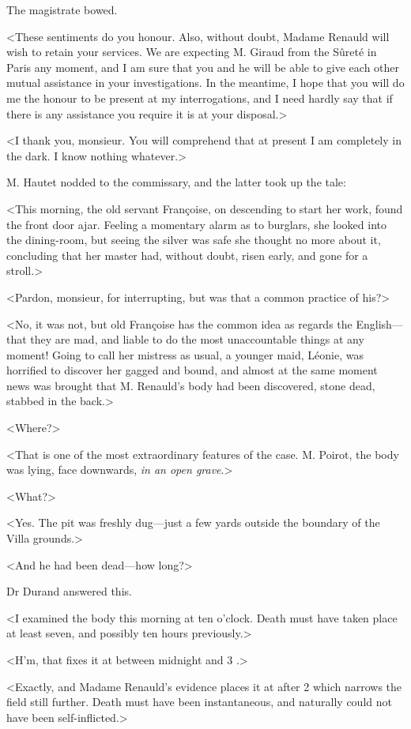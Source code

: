  The magistrate bowed. 

 <These sentiments do you honour. Also, without doubt, Madame Renauld will wish to retain your services. We are expecting M. Giraud from the Sûreté in Paris any moment, and I am sure that you and he will be able to give each other mutual assistance in your investigations. In the meantime, I hope that you will do me the honour to be present at my interrogations, and I need hardly say that if there is any assistance you require it is at your disposal.> 

 <I thank you, monsieur. You will comprehend that at present I am completely in the dark. I know nothing whatever.> 

 M. Hautet nodded to the commissary, and the latter took up the tale: 

 <This morning, the old servant Françoise, on descending to start her work, found the front door ajar. Feeling a momentary alarm as to burglars, she looked into the dining-room, but seeing the silver was safe she thought no more about it, concluding that her master had, without doubt, risen early, and gone for a stroll.> 

 <Pardon, monsieur, for interrupting, but was that a common practice of his?> 

 <No, it was not, but old Françoise has the common idea as regards the English—that they are mad, and liable to do the most unaccountable things at any moment! Going to call her mistress as usual, a younger maid, Léonie, was horrified to discover her gagged and bound, and almost at the same moment news was brought that M. Renauld's body had been discovered, stone dead, stabbed in the back.> 

 <Where?> 

 <That is one of the most extraordinary features of the case. M. Poirot, the body was lying, face downwards, \emph{in an open grave}.> 

 <What?> 

 <Yes. The pit was freshly dug—just a few yards outside the boundary of the Villa grounds.> 

 <And he had been dead—how long?> 

 Dr Durand answered this. 

 <I examined the body this morning at ten o'clock. Death must have taken place at least seven, and possibly ten hours previously.> 

 <H'm, that fixes it at between midnight and 3 .> 

 <Exactly, and Madame Renauld's evidence places it at after 2  which narrows the field still further. Death must have been instantaneous, and naturally could not have been self-inflicted.> 

